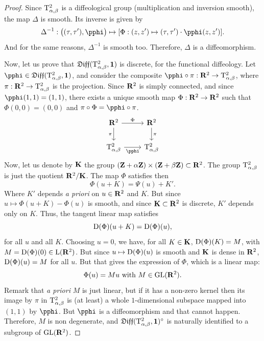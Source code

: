 \begin{proof}
  Since $\mathrm{T}^2_{\alpha,\beta}$ is a diffeological group (multiplication and inversion smooth),
  the map $\Delta$ is smooth.
  Its inverse is given by
  $$%
    \Delta^{-1} : \big((\tau,\tau'),\pphi\big) \mapsto [\Phi:(z,z') \mapsto (\tau,\tau') \cdot \pphi(z,z')].
    $$%
  And for the same reasons,
  $\Delta^{-1}$ is  smooth too.
  Therefore, $\Delta$ is a diffeomorphism.
  
  Now,
  let us prove that $\mathfrak{Diff}(\mathrm{T}^2_{\alpha,\beta},{\mathbf{1}})$ is discrete,
  for the functional diffeology.
  Let $\pphi \in \Diff(\Torus^2_{\alpha,\beta},\Id)$, and consider the composite $\pphi \circ \pi : \RR^2 \to \Torus^2_{\alpha,\beta}$,
  where $\pi : \mathbf{R}^2 \to \mathrm{T}^2_{\alpha,\beta}$ is the projection.
  Since $\mathbf{R}^2$ is simply connected,
  and since $\pphi(1,1)=(1,1)$,
  there exists a unique smooth map $\Phi: \mathbf{R}^2 \to \mathbf{R}^2$ such that $\Phi(0,0)=(0,0)$ and $\pi \circ \Phi = \pphi \circ \pi$.
  \[
  \begin{tikzcd}
    \RR^2 \arrow{r}{\Phi} \arrow[swap]{d}{\pi} & \RR^2 \arrow{d}{\pi}      \\
    \Torus^2_{\alpha,\beta} \arrow{r}[swap]{\pphi}  & \Torus^2_{\alpha,\beta}
  \end{tikzcd}
  \]
  Now,
  let us denote by ${\mathbf K}$ the group $(\mathbf{Z}+\alpha\mathbf{Z}) \times (\mathbf{Z}+\beta\mathbf{Z}) \subset \mathbf{R}^2$.
  The group $\mathrm{T}^2_{\alpha,\beta}$ is just the quotient $\mathbf{R}^2/{\mathbf K}$.
  The map $\Phi$ satisfies then
  $$%
    \Phi(u + K) = \Psi(u) + K'.
    $$%
  Where $K'$ depends {\em a priori} on $u \in \mathbf{R}^2$ and $K$.
  But since $u \mapsto \Phi(u + K) - \Phi(u)$ is smooth,
  and since ${\mathbf K} \subset \mathbf{R}^2$ is discrete,
  $K'$ depends only on $K$.
  Thus,
  the tangent linear map satisfies
  $$%
    \Der(\Phi)(u+K) = \Der(\Phi)(u),
    $$%
  for all $u$ and all $K$.
  Choosing $u=0$,
  we have,
  for all $K \in {\mathbf K}$,
  $\operatorname{D}(\Phi)(K) = M$,
  with $M = \operatorname{D}(\Phi)(0) \in \operatorname{L}(\mathbf{R}^2)$.
  But since $u \mapsto \operatorname{D}(\Phi)(u)$ is smooth and ${\mathbf K}$ is dense in $\mathbf{R}^2$,
  $\operatorname{D}(\Phi)(u) = M$ for all $u$.
  But that gives the expression of $\Phi$,
  which is a linear map:
  $$%
    \Phi(u) = Mu \SpacedText{with} M \in \GL(\RR^2).
    $$%
  Remark that {\em a priori} $M$ is just linear,
  but if it has a non-zero kernel then its image by $\pi$ in $\mathrm{T}^2_{\alpha,\beta}$ is (at least) a whole $1$-dimensional subspace mapped into $(1,1)$ by $\pphi$.
  But $\pphi$ is a diffeomorphism and that cannot happen.
  Therefore,
  $M$ is non degenerate,
  and $\mathfrak{Diff}(\mathrm{T}^2_{\alpha,\beta},{\mathbf{1}})^\circ$ is naturally identified to a subgroup of $\mathrm{GL}(\mathbf{R}^2)$.

\end{proof}
